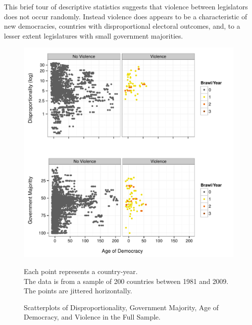 \documentclass[a4paper]{article}\usepackage{graphicx, color}
\newenvironment{knitrout}{}{} %
\begin{document}
This brief tour of descriptive statistics suggests that violence between legislators does not occur randomly. Instead violence does appears to be a characteristic of new democracies, countries with disproportional electoral outcomes, and, to a lesser extent legislatures with small government majorities.

\begin{figure}[t]
    \caption{Scatterplots of Disproportionality, Government Majority, Age of Democracy, and Violence in the Full Sample.}  
    \label{framework_empirical}
    \begin{center}

\begin{knitrout}
\color{fgcolor}
\includegraphics[width=0.8\linewidth]{figure/FrameworkEmpirical} 

\end{knitrout}

    \end{center}
    \begin{singlespace}
        {\scriptsize{Each point represents a country-year. \\ The data is from a sample of 200 countries between 1981 and 2009. The points are jittered horizontally.}}
    \end{singlespace}

\end{figure}

\end{document}
